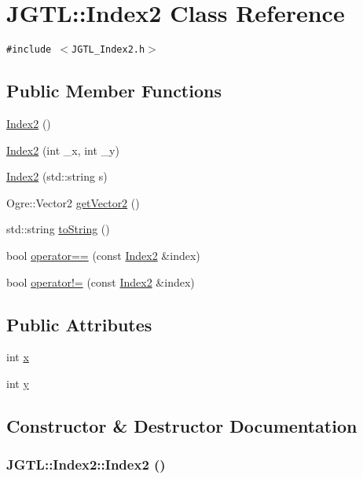 \hypertarget{class_j_g_t_l_1_1_index2}{
\section{JGTL::Index2 Class Reference}
\label{class_j_g_t_l_1_1_index2}
}
{\tt \#include $<$JGTL\_\-Index2.h$>$}

\subsection*{Public Member Functions}
\begin{CompactItemize}
\item 
\hyperlink{class_j_g_t_l_1_1_index2_de79343237193d2af361ff7bb4c5c58b}{Index2} ()
\item 
\hyperlink{class_j_g_t_l_1_1_index2_7cf2a0b1b27b7f23e672dce3651977a4}{Index2} (int \_\-x, int \_\-y)
\item 
\hyperlink{class_j_g_t_l_1_1_index2_ba365e79cfd722dcb17518902ba3001c}{Index2} (std::string s)
\item 
Ogre::Vector2 \hyperlink{class_j_g_t_l_1_1_index2_e98b51555c8ece032c91aa828646ba15}{get\-Vector2} ()
\item 
std::string \hyperlink{class_j_g_t_l_1_1_index2_be2673713b217c79db1e93287a9aa2bb}{to\-String} ()
\item 
bool \hyperlink{class_j_g_t_l_1_1_index2_68ce5b51f0249e1ec5c9c06481ba8423}{operator==} (const \hyperlink{class_j_g_t_l_1_1_index2}{Index2} \&index)
\item 
bool \hyperlink{class_j_g_t_l_1_1_index2_e97a27cfa0c26e2dda554109f5770799}{operator!=} (const \hyperlink{class_j_g_t_l_1_1_index2}{Index2} \&index)
\end{CompactItemize}
\subsection*{Public Attributes}
\begin{CompactItemize}
\item 
int \hyperlink{class_j_g_t_l_1_1_index2_2890321cfbdc826c6e33f15e6a0a0f2f}{x}
\item 
int \hyperlink{class_j_g_t_l_1_1_index2_921a51f4736b4239217532c60a81fa31}{y}
\end{CompactItemize}


\subsection{Constructor \& Destructor Documentation}
\hypertarget{class_j_g_t_l_1_1_index2_de79343237193d2af361ff7bb4c5c58b}{
\subsubsection[Index2]{\setlength{\rightskip}{0pt plus 5cm}JGTL::Index2::Index2 ()}}
\label{class_j_g_t_l_1_1_index2_de79343237193d2af361ff7bb4c5c58b}


